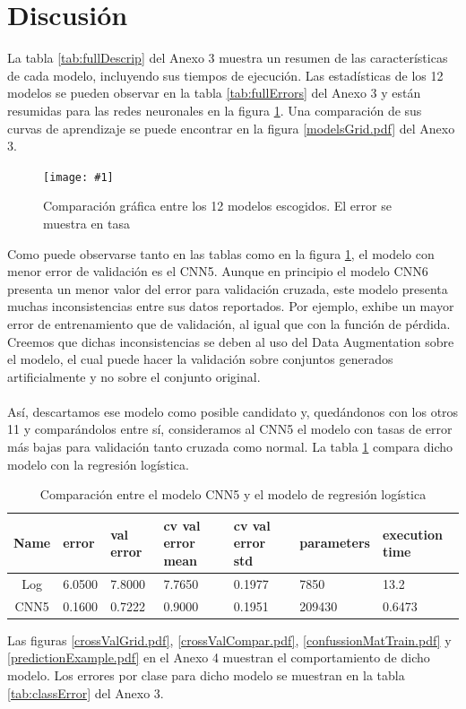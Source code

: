 \documentclass[11pt]{article}
\newcommand{\figura}[3]{\begin{figure}[H] \centering \texttt{[image: \#1]} \caption{#2} \label{#1}  \end{figure}}
\begin{document}
\section{Discusión}
La tabla \ref{tab:fullDescrip} del Anexo 3 muestra un resumen de las características de cada modelo, incluyendo sus tiempos de ejecución. Las estadísticas de los 12 modelos se pueden observar en la tabla \ref{tab:fullErrors} del Anexo 3 y están resumidas para las redes neuronales en la figura \ref{modelsPlot.pdf}. Una comparación de sus curvas de aprendizaje se puede encontrar en la figura \ref{modelsGrid.pdf} del Anexo 3. 
\figura{modelsPlot.pdf}{Comparación gráfica entre los 12 modelos escogidos. El error se muestra en tasa}{width = 0.7\textwidth}
Como puede observarse tanto en las tablas como en la figura \ref{modelsPlot.pdf}, el modelo con menor error de validación es el CNN5. Aunque en principio el modelo CNN6 presenta un menor valor del error para validación cruzada, este modelo presenta muchas inconsistencias entre sus datos reportados. Por ejemplo, exhibe un mayor error de entrenamiento que de validación, al igual que con la función de pérdida. Creemos que dichas inconsistencias se deben al uso del Data Augmentation sobre el modelo, el cual puede hacer  la validación sobre conjuntos generados artificialmente y no sobre el conjunto original.
\\
\\Así, descartamos ese modelo como posible candidato y, quedándonos con los otros 11 y comparándolos entre sí, consideramos al CNN5 el modelo con tasas de error más bajas para validación tanto cruzada  como normal. La tabla \ref{tab:finalCompar} compara dicho modelo con la regresión logística.
\begin{table}[h!]
    \centering
    \begin{tabular}{c| p{1.5cm}| p{1.5cm}| p{1.5cm}| p{1.5cm}| p{2cm}| p{1.5cm}| }
        \toprule
        Name &  error &  val error &  cv val error mean &  cv val error std & parameters & execution time \\
        \midrule
        Log  & 6.0500 &     7.8000 &             7.7650 &            0.1977 &  7850 & 13.2 \\ 
        CNN5 & 0.1600 &     0.7222 &             0.9000 &            0.1951 & 209430 & 0.6473 \\
        \bottomrule
        \end{tabular}
        \caption{Comparación entre el modelo CNN5 y el modelo de regresión logística}
    \label{tab:finalCompar}
\end{table}
Las figuras  \ref{crossValGrid.pdf}, \ref{crossValCompar.pdf}, \ref{confussionMatTrain.pdf} y  \ref{predictionExample.pdf} en el Anexo 4 muestran el comportamiento de dicho modelo. Los errores por clase para dicho modelo se muestran en la tabla \ref{tab:classError} del Anexo 3.
\end{document}
